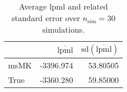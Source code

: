 \begin{table}[H]

\caption{Average lpml and related standard error over $n_{\text{sim}} = 30$ simulations.}
\centering
\begin{tabular}[t]{lrr}
\toprule
  & $\overbar{\text{lpml}}$ & $\text{sd}(\overbar{\text{lpml}})$\\
\midrule
msMK & -3396.974 & 53.80505\\
True & -3360.280 & 59.85000\\
\bottomrule
\end{tabular}
\end{table}